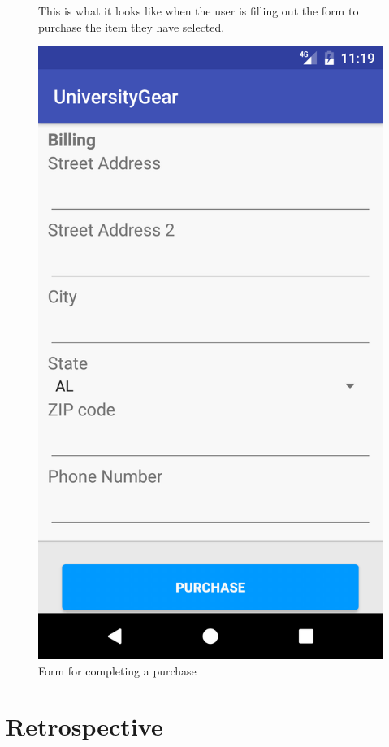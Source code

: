 \documentclass[journal,compsoc, 10pt, draftclsnofoot, onecolumn]{IEEEtran}
\begin{document}
\begin{figure}[t]
This is what it looks like when the user is filling out the form to purchase the 
item they have selected.
\centering
\caption{Form for completing a purchase}
\includegraphics[scale=.2]{purchase}
\end{figure}
\FloatBarrier

\section{Retrospective}
\end{document}
